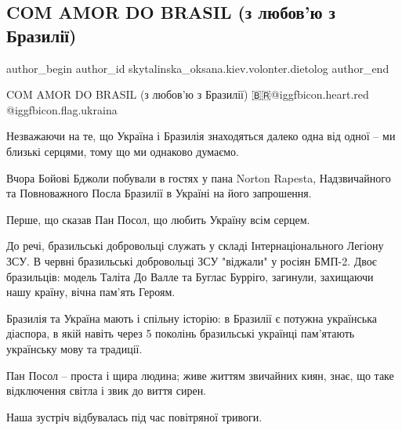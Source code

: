  
 
 
 
 
 
\subsection{COM AMOR DO BRASIL (з любов'ю з Бразилії)}
\label{sec:16_11_2022.fb.skytalinska_oksana.kiev.volonter.dietolog.1.com_amor_do_brasil}
 
\ifcmt
 author_begin
   author_id skytalinska_oksana.kiev.volonter.dietolog
 author_end
\fi

COM AMOR DO BRASIL (з любов'ю з Бразилії)
🇧🇷@igg{fbicon.heart.red} @igg{fbicon.flag.ukraina}

Незважаючи на те, що Україна і Бразилія знаходяться далеко одна від одної -- ми
близькі серцями, тому що ми однаково думаємо.

Вчора Бойові Бджоли побували в гостях у пана Norton Rapesta, Надзвичайного та
Повноважного Посла Бразилії в Україні на його запрошення.

Перше, що сказав Пан Посол, що любить Україну всім серцем.

До речі, бразильські добровольці служать у складі Інтернаціонального Легіону
ЗСУ. В червні бразильські добровольці ЗСУ "віджали" у росіян БМП-2. Двоє
бразильців: модель Таліта До Валле та Буглас Бурріго, загинули, захищаючи нашу
країну, вічна пам'ять Героям.

Бразилія та Україна мають і спільну історію: в Бразилії є потужна українська
діаспора, в якій навіть через 5 поколінь бразильські українці пам'ятають
українську мову та традиції.

Пан Посол -- проста і щира людина; живе життям звичайних киян, знає, що таке
відключення світла і звик до виття сирен.

Наша зустріч відбувалась під час повітряної тривоги.

